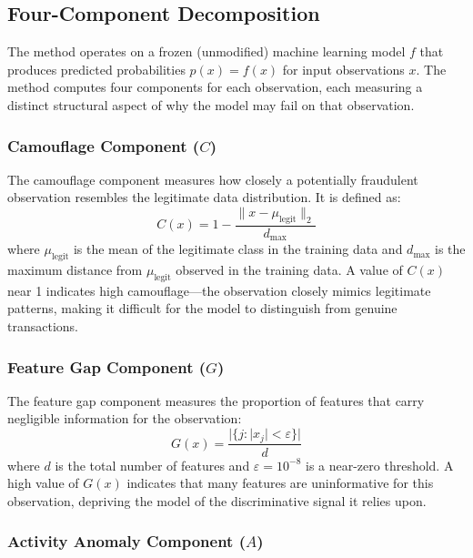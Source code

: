 \documentclass[12pt,a4paper]{article}
\begin{document}
\subsection{Four-Component Decomposition}

The method operates on a frozen (unmodified) machine learning model $f$ that 
produces predicted probabilities $p(x) = f(x)$ for input observations $x$. 
The method computes four components for each observation, each measuring a 
distinct structural aspect of why the model may fail on that observation.

\subsubsection{Camouflage Component ($C$)}

The camouflage component measures how closely a potentially fraudulent 
observation resembles the legitimate data distribution. It is defined as:
\begin{equation}
C(x) = 1 - \frac{\|x - \mu_{\text{legit}}\|_2}{d_{\max}}
\end{equation}
where $\mu_{\text{legit}}$ is the mean of the legitimate class in the 
training data and $d_{\max}$ is the maximum distance from 
$\mu_{\text{legit}}$ observed in the training data. A value of $C(x)$ near 
1 indicates high camouflage---the observation closely mimics legitimate 
patterns, making it difficult for the model to distinguish from genuine 
transactions.

\subsubsection{Feature Gap Component ($G$)}

The feature gap component measures the proportion of features that carry 
negligible information for the observation:
\begin{equation}
G(x) = \frac{|\{j : |x_j| < \varepsilon\}|}{d}
\end{equation}
where $d$ is the total number of features and $\varepsilon = 10^{-8}$ is a 
near-zero threshold. A high value of $G(x)$ indicates that many features 
are uninformative for this observation, depriving the model of the 
discriminative signal it relies upon.

\subsubsection{Activity Anomaly Component ($A$)}
\end{document}
